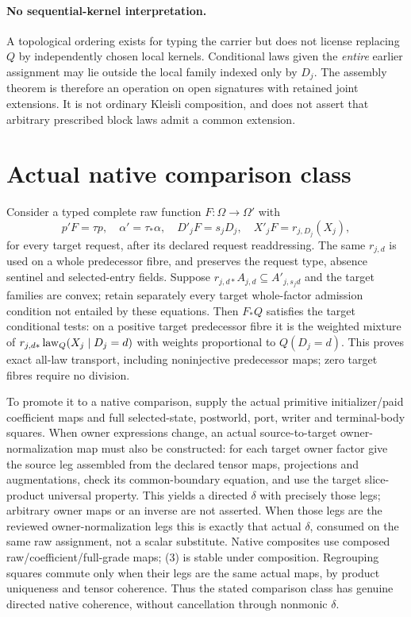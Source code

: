 \documentclass[11pt]{article}
\begin{document}
\paragraph{No sequential-kernel interpretation.}
A topological ordering exists for typing the carrier but does not license replacing $Q$ by independently chosen local kernels. Conditional laws given the \emph{entire} earlier assignment may lie outside the local family indexed only by $D_j$. The assembly theorem is therefore an operation on open signatures with retained joint extensions. It is not ordinary Kleisli composition, and does not assert that arbitrary prescribed block laws admit a common extension.

\section{Actual native comparison class}
Consider a typed complete raw function $F:\Omega\to\Omega'$ with
\[
 p'F=\tau p,\quad \alpha'=\tau_*\alpha,\quad
 D'_jF=s_jD_j,\quad X'_jF=r_{j,D_j}(X_j),              \tag{3}
\]
for every target request, after its declared request readdressing. The same $r_{j,d}$ is used on a whole predecessor fibre, and preserves the request type, absence sentinel and selected-entry fields. Suppose
$r_{j,d*}A_{j,d}\subseteq A'_{j,s_jd}$ and the target families are convex; retain separately every target whole-factor admission condition not entailed by these equations. Then $F_*Q$ satisfies the target conditional tests: on a positive target predecessor fibre it is the weighted mixture of $r_{j,d*}\mathop{\rm law}_Q(X_j\mid D_j=d)$ with weights proportional to $Q(D_j=d)$. This proves exact all-law transport, including noninjective predecessor maps; zero target fibres require no division.

To promote it to a native comparison, supply the actual primitive initializer/paid coefficient maps and full selected-state, postworld, port, writer and terminal-body squares. When owner expressions change, an actual source-to-target owner-normalization map must also be constructed: for each target owner factor give the source leg assembled from the declared tensor maps, projections and augmentations, check its common-boundary equation, and use the target slice-product universal property. This yields a directed $\delta$ with precisely those legs; arbitrary owner maps or an inverse are not asserted. When those legs are the reviewed owner-normalization legs this is exactly that actual $\delta$, consumed on the same raw assignment, not a scalar substitute. Native composites use composed raw/coefficient/full-grade maps; (3) is stable under composition. Regrouping squares commute only when their legs are the same actual maps, by product uniqueness and tensor coherence. Thus the stated comparison class has genuine directed native coherence, without cancellation through nonmonic $\delta$.
\end{document}
